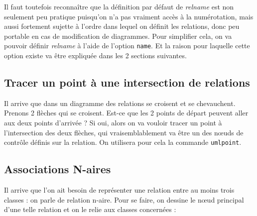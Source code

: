 \documentclass[a4paper,11pt]{report}
\newcommand{\inputTikZ}[1]{%
  }%
\newcommand{\inputTikZ}[1]{%
    \texttt{[image: fig/\#1.pdf]}%
  }%
\begin{document}
Il faut toutefois reconnaître que la définition par défaut de {\it relname} est non seulement peu pratique puisqu'on n'a pas vraiment accès à la numérotation, mais aussi fortement sujette à l'ordre dans lequel on définit les relations, donc peu portable en cas de modification de diagrammes. Pour simplifier cela, on va pouvoir définir {\it relname} à l'aide de l'option {\tt name}. Et la raison pour laquelle cette option existe va être expliquée dans les 2 sections suivantes.

\subsection{Tracer un point à une intersection de relations}\label{ss.relpt}

Il arrive que dans un diagramme des relations se croisent et se chevauchent. Prenons 2 flèches qui se croisent. Est-ce que les 2 points de départ peuvent aller aux deux points d'arrivée ? Si oui, alors on va vouloir tracer un point à l'intersection des deux flèches, qui vraisemblablement va être un des n\oe{}uds de contrôle définis sur la relation. On utilisera pour cela la commande {\tt umlpoint}.

\medskip

\begin{minipage}{0.5\textwidth}

\end{minipage}
\begin{minipage}{0.4\textwidth}
\begin{center}
\inputTikZ{point}
\end{center}
\end{minipage}

\subsection{Associations N-aires}

Il arrive que l'on ait besoin de représenter une relation entre au moins trois classes : on parle de relation n-aire. Pour se faire, on dessine le n\oe{}ud principal d'une telle relation et on le relie aux classes concernées :

\medskip

\begin{minipage}{0.5\textwidth}

\end{minipage}
\begin{minipage}{0.4\textwidth}
\begin{center}
\inputTikZ{naryassoc}
\end{center}
\end{minipage}
\end{document}
